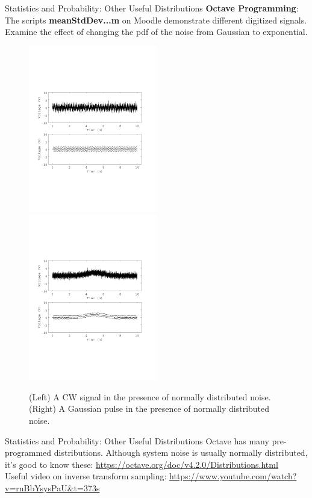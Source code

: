 \documentclass{beamer}
\begin{document}
\begin{frame}[fragile]{Statistics and Probability: Other Useful Distributions}
\small
\textbf{Octave Programming}: The scripts \textbf{meanStdDev...m} on Moodle demonstrate different digitized signals.  Examine the effect of changing the pdf of the noise from Gaussian to exponential.
\begin{figure}
\centering
\includegraphics[width=0.5\textwidth,trim=0cm 6cm 0cm 6cm,clip=true]{figures/meanStdDev_plusCW.pdf}
\includegraphics[width=0.5\textwidth,trim=0cm 6cm 0cm 6cm,clip=true]{figures/meanStdDev_plusGaussian.pdf}
\caption{\label{fig:dropin} (Left) A CW signal in the presence of normally distributed noise. (Right) A Gaussian pulse in the presence of normally distributed noise.}
\end{figure}
\end{frame}

\begin{frame}[fragile]{Statistics and Probability: Other Useful Distributions}
\small
Octave has many pre-programmed distributions.  Although system noise is usually normally distributed, it's good to know these:
\url{https://octave.org/doc/v4.2.0/Distributions.html} \\ \vspace{0.5cm}
Useful video on inverse transform sampling: \url{https://www.youtube.com/watch?v=rnBbYsysPaU&t=373s}
\end{frame}
\end{document}
